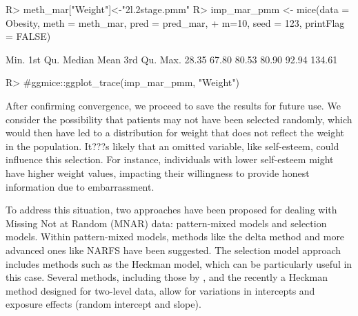 \documentclass[
]{jss}
\begin{document}
\begin{CodeChunk}
\begin{CodeInput}
R> meth_mar["Weight"]<-"2l.2stage.pmm" 
R> imp_mar_pmm <- mice(data = Obesity, meth = meth_mar, pred = pred_mar,
+                     m=10, seed = 123, printFlag = FALSE)
\end{CodeInput}
\end{CodeChunk}

\begin{CodeChunk}
\begin{CodeOutput}
   Min. 1st Qu.  Median    Mean 3rd Qu.    Max. 
  28.35   67.80   80.53   80.90   92.94  134.61 
\end{CodeOutput}
\begin{CodeInput}
R> #ggmice::ggplot_trace(imp_mar_pmm, "Weight")
\end{CodeInput}
\end{CodeChunk}

After confirming convergence, we proceed to save the results for future
use. We consider the possibility that patients may not have been
selected randomly, which would then have led to a distribution for
weight that does not reflect the weight in the population. It???s likely
that an omitted variable, like self-esteem, could influence this
selection. For instance, individuals with lower self-esteem might have
higher weight values, impacting their willingness to provide honest
information due to embarrassment.

To address this situation, two approaches have been proposed for dealing
with Missing Not at Random (MNAR) data: pattern-mixed models and
selection models. Within pattern-mixed models, methods like the delta
method and more advanced ones like NARFS have been suggested. The
selection model approach includes methods such as the Heckman model,
which can be particularly useful in this case. Several methods,
including those by \cite{Galimar_2017,Hammon_2021}, and the recently a
Heckman method designed for two-level data, allow for variations in
intercepts and exposure effects (random intercept and slope).
\end{document}
